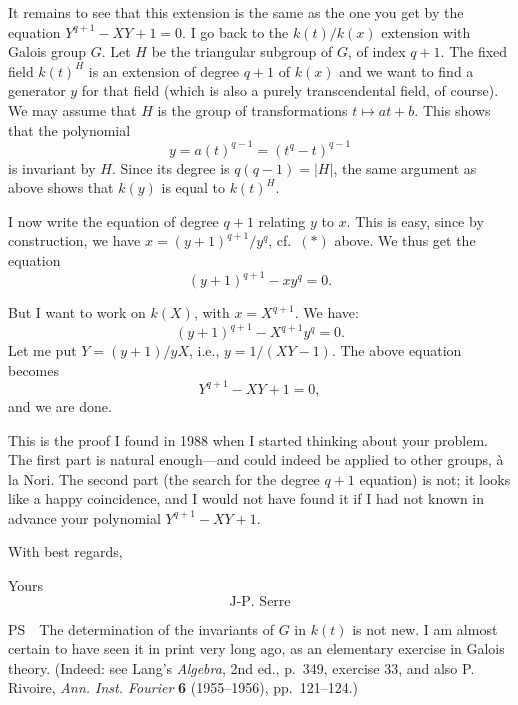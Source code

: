 \par
It remains to see that this extension is the same as the one
you get by the equation $Y^{q+1}-XY+1=0$.
I go back to the $k(t)/k(x)$ extension with Galois group 
$G$.
Let $H$ be the triangular subgroup of $G$, of index $q+1$.
The fixed field $k(t)^H$ is an extension of degree $q+1$
of $k(x)$ and we want to find a generator $y$ for that field 
(which
is also a purely transcendental field, of course). We may 
assume
that $H$ is the group of transformations $t\mapsto at+b$. 
This 
shows that the polynomial
$$
y=a(t)^{q-1}=(t^q-t)^{q-1}
$$
is invariant by $H$. Since its degree is $q(q-1)=|H|$, the 
same
argument as above shows that $k(y)$ is equal to $k(t)^H$.
\par
I now write the equation of degree $q+1$ relating $y$ to $x$. 
This
is easy, since by construction, we have $x=(y+1)^{q+1}/y^q$,
cf.\ $(\ast)$ above. We thus get the equation
$$
(y+1)^{q+1}-xy^q=0.
$$
\par
But I want to work on $k(X)$, with $x=X^{q+1}$. We have:
$$
(y+1)^{q+1}-X^{q+1}y^q=0.
$$
Let me put $Y=(y+1)/yX$, i.e., $y=1/(XY-1)$. The above 
equation
becomes
$$
Y^{q+1}-XY+1=0,
$$
and we are done.
\par
This is the proof I found in 1988
when I started thinking about your
problem. The first part is natural
enough---and could indeed be applied
to other groups, \`a la Nori. The second
part (the search for the degree $q+1$
equation) is not; it looks like a happy
coincidence, and I would not have found
it if I had not known in advance your
polynomial $Y^{q+1}-XY+1$.
\par
With best regards,
\par
\quad Yours
$$
\text{J-P. Serre}
$$
\par
\noindent PS\<$\quad$\<The determination of the
invariants of $G$ in $k(t)$ is not new.
I am almost certain to have seen it in print very
long ago, as an elementary exercise in Galois
theory. (Indeed: see Lang's {\it Algebra\/},
2nd ed., p.\ 349, exercise 33, and also P. Rivoire,
{\it Ann. Inst. Fourier\/} {\bf6} (1955--1956),
pp.\ 121--124.)

